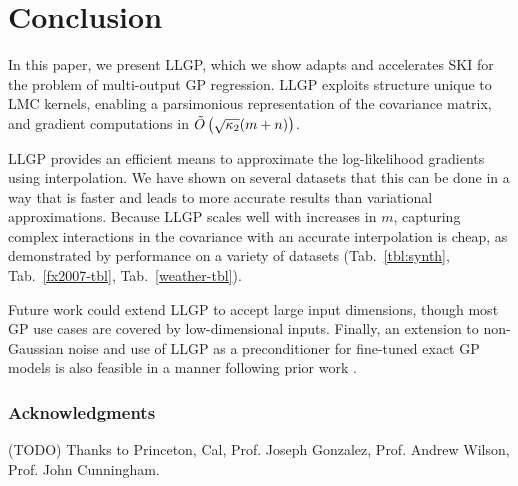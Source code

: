 \documentclass[twoside]{article}
\newif\ifanonymized
\begin{document}
\section{Conclusion}\label{conclusion}

In this paper, we present LLGP, which we show adapts and accelerates SKI \citep{kiss-gp} for the problem of multi-output GP regression. LLGP exploits structure unique to LMC kernels,  enabling a parsimonious representation of the covariance matrix, and gradient computations in $\tilde{O}\left({\sqrt{\kappa_2}(m+n)}\right)$.

LLGP provides an efficient means to approximate the log-likelihood gradients using interpolation. We have shown on several datasets that this can be done in a way that is faster and leads to more accurate results than variational approximations. Because LLGP scales well with increases in $m$, capturing complex interactions in the covariance with an accurate interpolation is cheap, as demonstrated by performance on a variety of datasets (Tab.~\ref{tbl:synth}, Tab.~\ref{fx2007-tbl}, Tab.~\ref{weather-tbl}).

Future work could extend LLGP to accept large input dimensions, though most GP use cases are covered by low-dimensional inputs. Finally, an extension to non-Gaussian noise and use of LLGP as a preconditioner for fine-tuned exact GP models is also feasible in a manner following prior work \citep{cutajar2016preconditioning}.

\ifanonymized

\else
\subsubsection*{Acknowledgments}
(TODO) Thanks to Princeton, Cal, Prof. Joseph Gonzalez, Prof. Andrew Wilson, Prof. John Cunningham.
\fi



\end{document}
